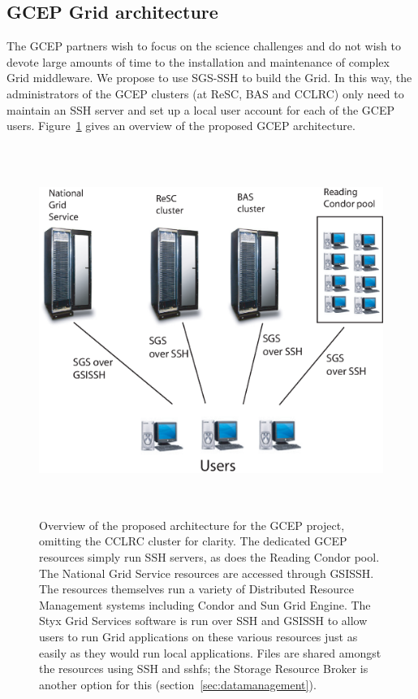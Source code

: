 \documentclass[a4paper]{article}
\begin{document}
\begin{multicols}{2}
\subsection{GCEP Grid architecture}

The GCEP partners wish to focus on the science challenges and do not wish to devote large amounts of time to the installation and maintenance of complex Grid middleware.  We propose to use SGS-SSH to build the Grid.  In this way, the administrators of the GCEP clusters (at ReSC, BAS and CCLRC) only need to maintain an SSH server and set up a local user account for each of the GCEP users.  Figure~\ref{fig:gcep} gives an overview of the proposed GCEP architecture.

\begin{figure}
\centering
\includegraphics[height=12cm]{GCEP_architecture.eps}
\caption{Overview of the proposed architecture for the GCEP project, omitting the CCLRC cluster for clarity. The dedicated GCEP resources simply run SSH servers, as does the Reading Condor pool.  The National Grid Service resources are accessed through GSISSH.  The resources themselves run a variety of Distributed Resource Management systems including Condor and Sun Grid Engine.  The Styx Grid Services software is run over SSH and GSISSH to allow users to run Grid applications on these various resources just as easily as they would run local applications.  Files are shared amongst the resources using SSH and sshfs; the Storage Resource Broker is another option for this (section~\ref{sec:datamanagement}).} 
\label{fig:gcep}
\end{figure}


\end{multicols}
\end{document}
